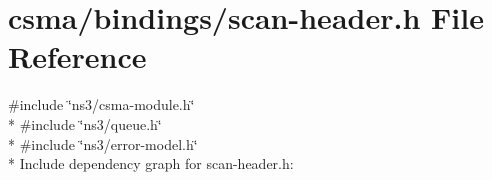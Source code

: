 \hypertarget{csma_2bindings_2scan-header_8h}{}\section{csma/bindings/scan-\/header.h File Reference}
\label{csma_2bindings_2scan-header_8h}
{\ttfamily \#include \char`\"{}ns3/csma-\/module.\+h\char`\"{}}\\*
{\ttfamily \#include \char`\"{}ns3/queue.\+h\char`\"{}}\\*
{\ttfamily \#include \char`\"{}ns3/error-\/model.\+h\char`\"{}}\\*
Include dependency graph for scan-\/header.h\+:
